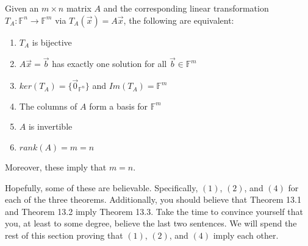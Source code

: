 \begin{theorem}
    Given an $m\times n$ matrix $A$ and the corresponding linear transformation $T_A:\mathbb{F}^n\to\mathbb{F}^m$ via $T_A(\vec{x})=A\vec{x}$, the following are equivalent:
    \begin{enumerate}
        \item $T_A$ is bijective
        \item $A\vec{x}=\vec{b}$ has exactly one solution for all $\vec{b}\in\mathbb{F}^m$
        \item $ker(T_A)=\{\vec{0}_{\mathbb{F}^n}\}$ and $Im(T_A)=\mathbb{F}^m$
        \item The columns of $A$ form a basis for $\mathbb{F}^m$
        \item $A$ is invertible
        \item $rank(A)=m=n$
    \end{enumerate}
    Moreover, these imply that $m=n$.
\end{theorem}
Hopefully, some of these are believable. Specifically, $(1)$, $(2)$, and $(4)$ for each of the three theorems. Additionally, you should believe that Theorem 13.1 and Theorem 13.2 imply Theorem 13.3. Take the time to convince yourself that you, at least to some degree, believe the last two sentences. We will spend the rest of this section proving that $(1)$, $(2)$, and $(4)$ imply each other.


